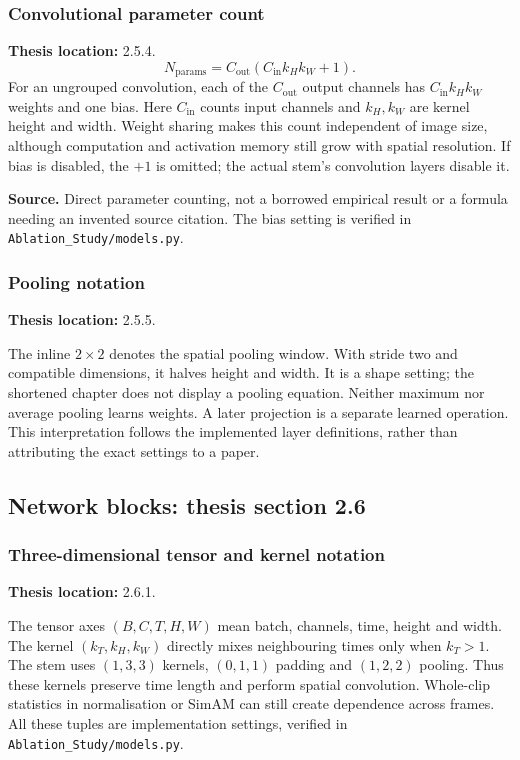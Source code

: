 \documentclass[11pt,a4paper]{article}
\numberwithin{equation}{section}
\begin{document}
\subsubsection{Convolutional parameter count}
\label{fg:convparams}
\textbf{Thesis location:} 2.5.4.
\begin{equation}
    N_{\mathrm{params}}=C_{\mathrm{out}}
       (C_{\mathrm{in}}k_Hk_W+1).
    \label{fg:eq:convparams}
\end{equation}
For an ungrouped convolution, each of the $C_{\mathrm{out}}$ output channels has $C_{\mathrm{in}}k_Hk_W$
weights and one bias. Here $C_{\mathrm{in}}$ counts input channels and
$k_H,k_W$ are kernel height and width. Weight sharing makes this count
independent of image size, although computation and activation memory still
grow with spatial resolution. If bias is disabled, the $+1$ is omitted; the
actual stem's convolution layers disable it.

\textbf{Source.} Direct parameter counting, not a borrowed empirical result
or a formula needing an invented source citation. The bias setting is verified
in \texttt{Ablation\_Study/models.py}.

\subsubsection{Pooling notation}
\label{fg:pool}
\textbf{Thesis location:} 2.5.5.

The inline $2\times2$ denotes the spatial pooling window. With stride two and
compatible dimensions, it halves height and width. It is a shape setting;
the shortened chapter does not display a pooling equation. Neither maximum
nor average pooling learns weights. A later projection is a separate learned
operation. This interpretation follows the implemented layer definitions,
rather than attributing the exact settings to a paper.

\subsection{Network blocks: thesis section 2.6}

\subsubsection{Three-dimensional tensor and kernel notation}
\label{fg:conv3d}
\textbf{Thesis location:} 2.6.1.

The tensor axes $(B,C,T,H,W)$ mean batch, channels, time, height and width.
The kernel $(k_T,k_H,k_W)$ directly mixes neighbouring times only when
$k_T>1$. The stem uses $(1,3,3)$ kernels, $(0,1,1)$ padding and $(1,2,2)$
pooling. Thus these kernels preserve time length and perform spatial
convolution. Whole-clip statistics in normalisation or SimAM can still create
dependence across frames. All these tuples are implementation settings,
verified in \texttt{Ablation\_Study/models.py}.
\end{document}
